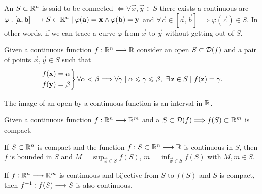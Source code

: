 \begin{defn}\label{def:connected-set}
    An  $S\subset\Rtn$ is said to be connected $\iff\forall\vec{x}, \vec{y}\in S$ there exists a 
        continuous arc $\appl{\varphi}{[\vec{a}, \vec{b}]}{S\subset\Rtn}\st\varphi(\vec{a}) = \vec{x}\land\varphi(\vec{b})
        = \vec{y}$ and $\forall\vec{c}\in [\vec{a}, \vec{b}]\implies\varphi(\vec{c})\in S$. In other words, if we can trace
        a curve $\varphi$ from $\vec{x}$ to $\vec{y}$ without getting out of $S$.
\end{defn}

\begin{theorem}
    Given a continuous function $\appl{f}{\Rtn}{\R}$ consider an open  $S\subset\dom{f}$ and a
    pair of points $\vec{x}, \vec{y}\in S$ such that
    \begin{equation}
        \begin{rcases}
            f(\vec{x}) = \vec{\alpha} \\
            f(\vec{y}) = \vec{\beta}
        \end{rcases}\forall\vec{\alpha} < \vec{\beta}\implies\forall\vec{\gamma}\st\vec{\alpha}\leq\vec{\gamma}\leq\vec{\beta},\ \exists\vec{z}\in S\st 
    f(\vec{z}) = \vec{\gamma}.
    \end{equation}
\end{theorem}

\begin{theorem}
    The image of an open  by a continuous function is an interval in $\R$.
\end{theorem}

\begin{theorem}
    Given a continuous function $\appl{f}{\Rtn}{\R^m}$ and a  $S\subset\dom{f}\implies f(S)\subset\R^m$
    is compact.
\end{theorem}

\begin{theorem}
    If $S\subset\Rtn$ is compact and the function $\appl{f}{S\subset\Rtn}{\R}$ is continuous in $S$, then $f$ is bounded
    in $S$ and $M = \sup_{\vec{x}\in S} f(S)$, $m = \inf_{\vec{x}\in S} f(S)$ with $M, m\in S$.
\end{theorem}

\begin{theorem}
    If $\appl{f}{\Rtn}{\R^m}$ is continuous and bijective from $S$ to $f(S)$ and $S$ is compact, then 
    $f ^{-1} : f(S)\longrightarrow S$ is also continuous.
\end{theorem}

